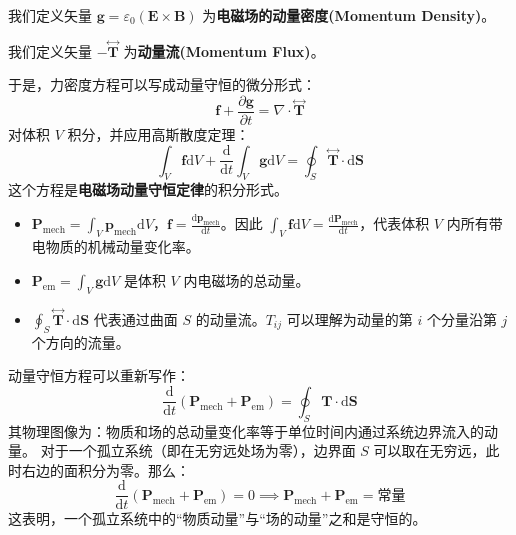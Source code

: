 \documentclass[fontset=none]{ctexart}
\begin{document}
\begin{definition}[电磁场动量密度]
我们定义矢量 $\bm{g} = \varepsilon_0(\bm{E} \times \bm{B})$ 为\textbf{电磁场的动量密度(Momentum Density)}。
\end{definition}

\begin{definition}[动量流]
    我们定义矢量 $- \overset{\leftrightarrow}{\bm{T}}$ 为\textbf{动量流(Momentum Flux)}。
\end{definition}

于是，力密度方程可以写成动量守恒的微分形式：
\begin{equation}
    \bm{f} + \frac{\partial \bm{g}}{\partial t} = \nabla \cdot \overset{\leftrightarrow}{\bm{T}}
\end{equation}
对体积 $V$ 积分，并应用高斯散度定理：
\begin{equation}
    \int_V \bm{f} \mathrm{d}V + \frac{\mathrm{d}}{\mathrm{d}t}\int_V \bm{g} \mathrm{d}V 
    = \oint_S \overset{\leftrightarrow}{\bm{T}} \cdot \mathrm{d}\bm{S}
\end{equation}
这个方程是\textbf{电磁场动量守恒定律}的积分形式。
\begin{itemize}
    \item $\bm{P}_{\text{mech}} = \int_V \bm{p}_{\text{mech}} \mathrm{d}V$，$\bm{f} = \frac{\mathrm{d}\bm{p}_{\text{mech}}}{\mathrm{d}t}$。因此 $\int_V \bm{f} \mathrm{d}V = \frac{\mathrm{d}\bm{P}_{\text{mech}}}{\mathrm{d}t}$，代表体积 $V$ 内所有带电物质的机械动量变化率。
    \item $\bm{P}_{\text{em}} = \int_V \bm{g} \mathrm{d}V$ 是体积 $V$ 内电磁场的总动量。
    \item $\oint_S \overset{\leftrightarrow}{\bm{T}} \cdot \mathrm{d}\bm{S}$ 代表通过曲面 $S$ 的动量流。$T_{ij}$ 可以理解为动量的第 $i$ 个分量沿第 $j$ 个方向的流量。
\end{itemize}
动量守恒方程可以重新写作：
\begin{equation}
    \frac{\mathrm{d}}{\mathrm{d}t}(\bm{P}_{\text{mech}} + \bm{P}_{\text{em}}) = \oint_S \mathbf{T} \cdot \mathrm{d}\bm{S}
\end{equation}
其物理图像为：物质和场的总动量变化率等于单位时间内通过系统边界流入的动量。
对于一个孤立系统（即在无穷远处场为零），边界面 $S$ 可以取在无穷远，此时右边的面积分为零。那么：
\begin{equation}
    \frac{\mathrm{d}}{\mathrm{d}t}(\bm{P}_{\text{mech}} + \bm{P}_{\text{em}}) = 0 \implies \bm{P}_{\text{mech}} + \bm{P}_{\text{em}} = \text{常量}
\end{equation}
这表明，一个孤立系统中的“物质动量”与“场的动量”之和是守恒的。
\end{document}
